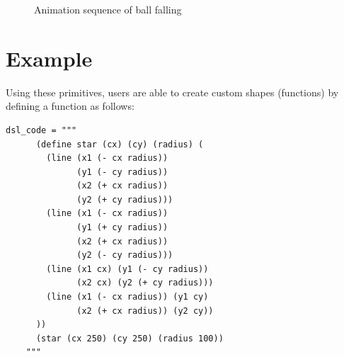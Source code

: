 \documentclass[acmsmall,screen]{acmart}
\begin{document}
\begin{figure}[!tbp]
  \centering
  \hfill
  \hfill
  \hfill
  \caption{Animation sequence of ball falling}
\end{figure}

\section{Example}
Using these primitives, users are able to create custom shapes (functions) by defining a function as follows:

\begin{lstlisting}[label=code, caption=Sample custom function definition in Animato]
    dsl_code = """
      (define star (cx) (cy) (radius) (
        (line (x1 (- cx radius))
              (y1 (- cy radius))
              (x2 (+ cx radius))
              (y2 (+ cy radius)))
        (line (x1 (- cx radius))
              (y1 (+ cy radius))
              (x2 (+ cx radius))
              (y2 (- cy radius)))
        (line (x1 cx) (y1 (- cy radius))
              (x2 cx) (y2 (+ cy radius)))
        (line (x1 (- cx radius)) (y1 cy)
              (x2 (+ cx radius)) (y2 cy))
      ))
      (star (cx 250) (cy 250) (radius 100))
    """
\end{lstlisting}
\end{document}
